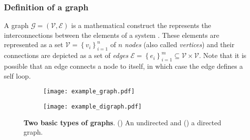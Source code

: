 \subsubsection{Definition of a graph}
A graph $\mathcal{G} = \left(\mathcal{V}, \mathcal{E}\right)$ is a mathematical construct the represents the interconnections between the elements of a system \cite{West2001Introductiongraphtheory}. These elements are represented as a set $ \mathcal{V}=\left\lbrace v_i\right\rbrace^n_{i=1}$ of $n$ \emph{nodes} (also called \emph{vertices}) and their connections are depicted as a set of \emph{edges} $ \mathcal{E}= \left\lbrace e_i\right\rbrace^m_{i=1} \subseteq \mathcal{V} \times \mathcal{V} $. Note that it is possible that an edge connects a node to itself, in which case the edge defines a self loop.
\begin{figure*}[!h]
	\centering	
	\hspace*{\fill}
	\begin{subfigure}[t]{0.32\textwidth}
		\subcaption{}
		\texttt{[image: example\_graph.pdf]}
		\label{fig:example_graph}
	\end{subfigure}	
	\hfill
	\begin{subfigure}[t]{0.32\textwidth}
		\subcaption{}
		\texttt{[image: example\_digraph.pdf]}
		\label{fig:example_digraph}
	\end{subfigure}
	\hspace*{\fill}	
	\caption[] {\label{fig:graph_examples} \textbf{Two basic types of graphs}. () An undirected and () a directed graph.}
\end{figure*}

